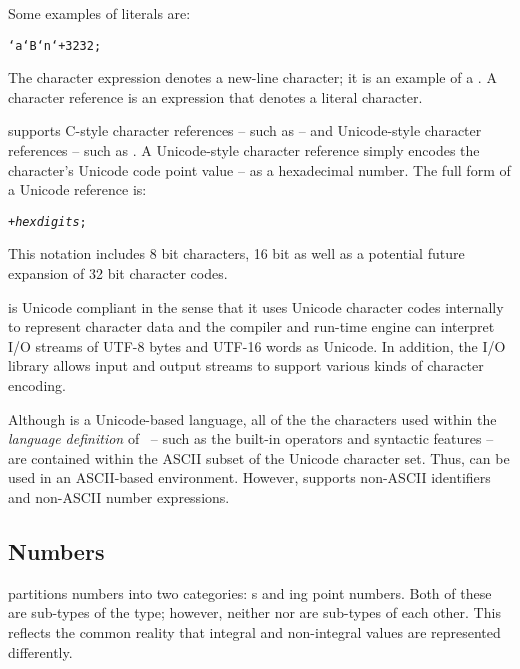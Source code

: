 Some examples of  literals are:
\begin{alltt}
`a `B `\bsl{}n `\bsl+3232;
\end{alltt}

The character expression  denotes a new-line character; it is an example of a . A character reference is an expression that denotes a literal character. 

\go supports C-style character references -- such as  -- and Unicode-style \cite{unicode:30} character references -- such as . A Unicode-style character reference simply encodes the character's Unicode code point value -- as a hexadecimal number. The full form of a Unicode reference is:
\begin{alltt}
\bsl{}+\emph{hexdigits};
\end{alltt}
This notation includes 8 bit characters, 16 bit as well as a potential future expansion of 32 bit character codes.

\go is Unicode compliant in the sense that it uses Unicode character codes internally to represent character data and the \go compiler and run-time engine can interpret I/O streams of UTF-8 bytes and UTF-16 words as Unicode. In addition, the I/O library allows input and output streams to support various kinds of character encoding.

\begin{aside}
Although \go is a Unicode-based language, all of the the characters used within the \emph{language definition} of \go\ -- such as the built-in operators and syntactic features -- are contained within the ASCII subset of the Unicode character set. Thus, \go can be used in an ASCII-based environment. However, \go supports non-ASCII identifiers and non-ASCII number expressions.
\end{aside}

\subsection{Numbers}
\label{expression:number}

\go partitions numbers into two categories: s and ing point numbers. Both of these are sub-types of the  type; however, neither  nor  are sub-types of each other. This reflects the common reality that integral and non-integral  values are represented differently.

